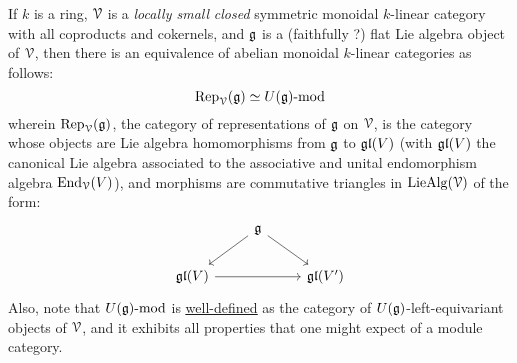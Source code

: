         \begin{theorem}
            If $k$ is a ring, $\mathcal{V}$ is a \textit{locally small} \textit{closed} symmetric monoidal $k$-linear category with all coproducts and cokernels, and $\mathfrak{g}$ is a (faithfully ?) flat Lie algebra object of $\mathcal{V}$, then there is an equivalence of abelian monoidal $k$-linear categories as follows:
                $$\mathrm{Rep}_{\mathcal{V}}(\mathfrak{g}) \simeq {U(\mathfrak{g})}\text{-}\mathrm{mod}$$
            wherein $\mathrm{Rep}_{\mathcal{V}}(\mathfrak{g})$, the category of representations of $\mathfrak{g}$ on $\mathcal{V}$, is the category whose objects are Lie algebra homomorphisms from $\mathfrak{g}$ to $\mathfrak{gl}(V)$ (with $\mathfrak{gl}(V)$ the canonical Lie algebra associated to the associative and unital endomorphism algebra $\mathrm{End}_{\mathcal{V}}(V)$), and morphisms are commutative triangles in $\mathrm{Lie}\mathrm{Alg}(\mathcal{V})$ of the form:
                $$
                    \begin{tikzcd}
                    	& {\g} \\
                    	{\gl(V)} && {\gl(V')}
                    	\arrow[from=2-1, to=2-3]
                    	\arrow[from=1-2, to=2-1]
                    	\arrow[from=1-2, to=2-3]
                    \end{tikzcd}
                $$
            Also, note that ${U(\mathfrak{g})}\text{-}\mathrm{mod}$ is \href{https://ncatlab.org/nlab/show/module+over+a+monoid}{\underline{well-defined}} as the category of $U(\mathfrak{g})$-left-equivariant objects of $\mathcal{V}$, and it exhibits all properties that one might expect of a module category.
        \end{theorem}
